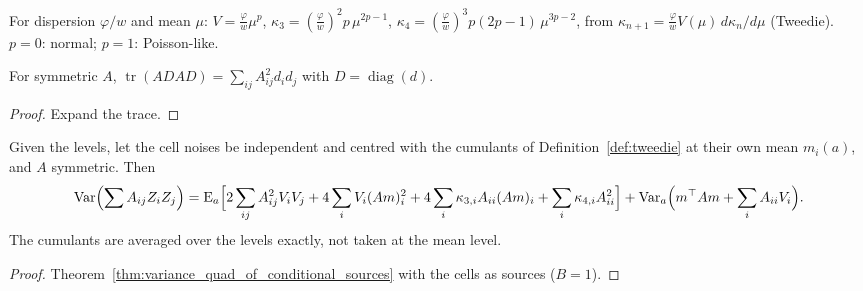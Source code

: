 \begin{definition}\label{def:tweedie}
  \leanok
  For dispersion $\varphi/w$ and mean $\mu$: $V = \tfrac{\varphi}{w}\mu^p$,
  $\kappa_3 = (\tfrac{\varphi}{w})^2p\,\mu^{2p-1}$, $\kappa_4 = (\tfrac{\varphi}{w})^3p(2p-1)\,\mu^{3p-2}$,
  from $\kappa_{n+1} = \tfrac{\varphi}{w}V(\mu)\,d\kappa_n/d\mu$ (Tweedie). $p = 0$: normal; $p = 1$: Poisson-like.
\end{definition}

\begin{lemma}\label{lem:trace_mul_diagonal}
  \leanok
  For symmetric $A$, $\operatorname{tr}(ADAD) = \sum_{ij}A_{ij}^2d_id_j$ with $D = \operatorname{diag}(d)$.
\end{lemma}
\begin{proof}
  \leanok
  Expand the trace.
\end{proof}

\begin{theorem}\label{thm:variance_quad_of_powerVariance}
  \leanok
  Given the levels, let the cell noises be independent and centred with the cumulants of
  Definition~\ref{def:tweedie} at their own mean $m_i(a)$, and $A$ symmetric. Then
  \[ \operatorname{Var}\Bigl(\sum A_{ij}Z_iZ_j\Bigr) = \operatorname{E}_a\Bigl[2\sum_{ij}A_{ij}^2V_iV_j
     + 4\sum_i V_i(Am)_i^2 + 4\sum_i\kappa_{3,i}A_{ii}(Am)_i + \sum_i\kappa_{4,i}A_{ii}^2\Bigr]
     + \operatorname{Var}_a\Bigl(m^\top Am + \sum_i A_{ii}V_i\Bigr). \]
  The cumulants are averaged over the levels exactly, not taken at the mean level.
\end{theorem}
\begin{proof}
  \leanok
  Theorem~\ref{thm:variance_quad_of_conditional_sources} with the cells as sources ($B = 1$).
\end{proof}

